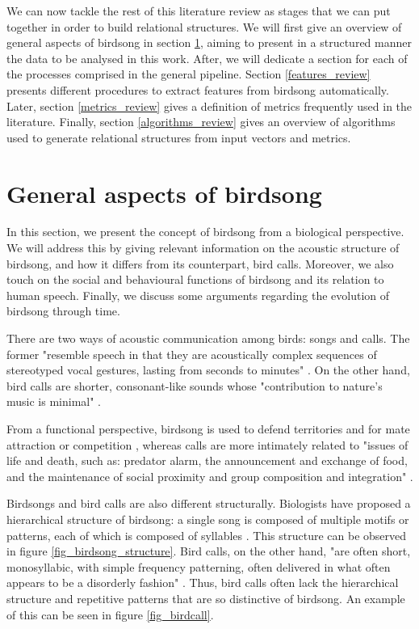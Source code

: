 \documentclass[../main.tex]{subfiles} \label{chapter_soa}
\begin{document}
\par We can now tackle the rest of this literature review as stages that we can put together in order to build relational structures. We will first give an overview of general aspects of birdsong in section \ref{birdsong_review}, aiming to present in a structured manner the data to be analysed in this work. After, we will dedicate a section for each of the processes comprised in the general pipeline. Section \ref{features_review} presents different procedures to extract features from birdsong automatically. Later, section \ref{metrics_review} gives a definition of metrics frequently used in the literature. Finally, section \ref{algorithms_review} gives an overview of algorithms used to generate relational structures from input vectors and metrics.

\section{General aspects of birdsong} \label{birdsong_review}
In this section, we present the concept of birdsong from a biological perspective. We will address this by giving relevant information on the acoustic structure of birdsong, and how it differs from its counterpart, bird calls. Moreover, we also touch on the social and behavioural functions of birdsong and its relation to human speech. Finally, we discuss some arguments regarding the evolution of birdsong through time.
\par There are two ways of acoustic communication among birds: songs and calls. The former "resemble speech in that they are acoustically complex sequences of stereotyped vocal gestures, lasting from seconds to minutes" \cite{Snowdon2013}. On the other hand, bird calls are shorter, consonant-like sounds whose "contribution to nature's music is minimal" \cite{Marler2004}. 
\par From a functional perspective, birdsong is used to defend territories and for mate attraction or competition \cite{Berwick2013} \cite{Naguib2014}, whereas calls are more intimately related to "issues of life and death, such as: predator alarm, the announcement and exchange of food, and the maintenance of social proximity and group composition and integration" \cite{Marler2004}.
\par Birdsongs and bird calls are also different structurally. Biologists have proposed a hierarchical structure of birdsong: a single song is composed of multiple motifs or patterns, each of which is composed of syllables \cite{Snowdon2013}. This structure can be observed in figure \ref{fig_birdsong_structure}. Bird calls, on the other hand, "are often short, monosyllabic, with simple frequency patterning, often delivered in what often appears to be a disorderly fashion" \cite{Marler2004}. Thus, bird calls often lack the hierarchical structure and repetitive patterns that are so distinctive of birdsong. An example of this can be seen in figure \ref{fig_birdcall}.
\end{document}

